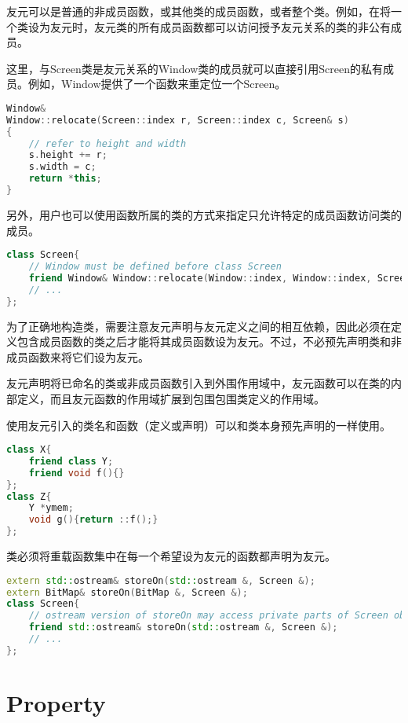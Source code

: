 友元可以是普通的非成员函数，或其他类的成员函数，或者整个类。例如，在将一个类设为友元时，友元类的所有成员函数都可以访问授予友元关系的类的非公有成员。

这里，与Screen类是友元关系的Window类的成员就可以直接引用Screen的私有成员。例如，Window提供了一个函数来重定位一个Screen。


\begin{lstlisting}[language=C++]
Window&
Window::relocate(Screen::index r, Screen::index c, Screen& s)
{
	// refer to height and width
	s.height += r;
	s.width = c;
	return *this;
}
\end{lstlisting}

另外，用户也可以使用函数所属的类的方式来指定只允许特定的成员函数访问类的成员。

\begin{lstlisting}[language=C++]
class Screen{
	// Window must be defined before class Screen
	friend Window& Window::relocate(Window::index, Window::index, Screen&);
	// ...
};
\end{lstlisting}

为了正确地构造类，需要注意友元声明与友元定义之间的相互依赖，因此必须在定义包含成员函数的类之后才能将其成员函数设为友元。不过，不必预先声明类和非成员函数来将它们设为友元。

友元声明将已命名的类或非成员函数引入到外围作用域中，友元函数可以在类的内部定义，而且友元函数的作用域扩展到包围包围类定义的作用域。

使用友元引入的类名和函数（定义或声明）可以和类本身预先声明的一样使用。

\begin{lstlisting}[language=C++]
class X{
	friend class Y;
	friend void f(){}
};
class Z{
	Y *ymem;
	void g(){return ::f();}
};
\end{lstlisting}

类必须将重载函数集中在每一个希望设为友元的函数都声明为友元。

\begin{lstlisting}[language=C++]
extern std::ostream& storeOn(std::ostream &, Screen &);
extern BitMap& storeOn(BitMap &, Screen &);
class Screen{
	// ostream version of storeOn may access private parts of Screen objects
	friend std::ostream& storeOn(std::ostream &, Screen &);
	// ...
};
\end{lstlisting}



\chapter{Property}



